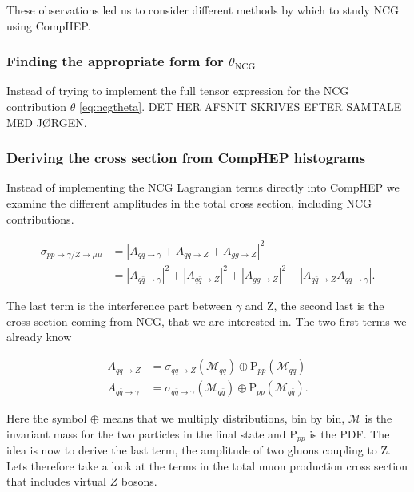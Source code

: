 These observations led us to consider different methods by which to study NCG using CompHEP.

\subsubsection{Finding the appropriate form for $\theta_\textrm{NCG}$}
Instead of trying to implement the full tensor expression for the NCG contribution $\theta$ \eqref{eq:ncgtheta}. DET HER AFSNIT SKRIVES EFTER SAMTALE MED JØRGEN.

\subsubsection{Deriving the cross section from CompHEP histograms}

Instead of implementing the NCG Lagrangian terms directly into CompHEP we examine the different amplitudes in the total cross section, including NCG contributions.

\begin{align}
\sigma_{pp \rightarrow \gamma/ Z \rightarrow \mu \bar \mu} &= |A_{q \bar q \rightarrow \gamma} + A_{q \bar q \rightarrow Z} + A_{gg \rightarrow Z}|^{2} \nonumber \\
&= |A_{q \bar q \rightarrow \gamma}|^{2} + |A_{q \bar q \rightarrow Z}|^ {2} + |A_{gg \rightarrow Z}|^{2} + |A_{q \bar q \rightarrow Z }A_{qq \rightarrow \gamma}|.
\end{align}

The last term is the interference part between $\gamma$ and Z, the second last is the cross section coming from NCG, that we are interested in. The two first terms we already know

\begin{align}
A_{q \bar q \rightarrow Z} &= \sigma_{q \bar q \rightarrow Z} (\mathcal{M}_{q \bar q}) \oplus \textrm{P}_{pp}(\mathcal{M}_{q \bar q}) \nonumber \\ 
A_{q \bar q \rightarrow \gamma} &= \sigma_{q \bar q \rightarrow  \gamma}( \mathcal{M}_{q \bar q}) \oplus \textrm{P}_{pp}(\mathcal{M}_{q \bar q}).
\end{align}

Here the symbol $\oplus$ means that we multiply distributions, bin by bin, $\mathcal{M}$ is the invariant mass for the two particles in the final state and P$_{pp}$ is the PDF. The idea is now to derive the last term, the amplitude of two gluons coupling to Z. Lets therefore take a look at the terms in the total muon production cross section that includes virtual $Z$ bosons.

